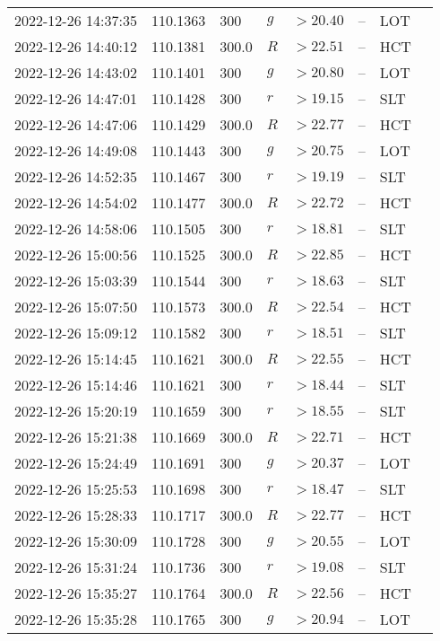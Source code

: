 \documentclass{nature_plusfigure}
\begin{document}
\begin{supplement}
\begin{center}
\begin{longtable}{llllllll}
2022-12-26 14:37:35 & 110.1363 & 300 & $g$ & $>20.40$ & -- & LOT &  \\ 
2022-12-26 14:40:12 & 110.1381 & 300.0 & $R$ & $>22.51$ & -- & HCT &  \\ 
2022-12-26 14:43:02 & 110.1401 & 300 & $g$ & $>20.80$ & -- & LOT &  \\ 
2022-12-26 14:47:01 & 110.1428 & 300 & $r$ & $>19.15$ & -- & SLT &  \\ 
2022-12-26 14:47:06 & 110.1429 & 300.0 & $R$ & $>22.77$ & -- & HCT &  \\ 
2022-12-26 14:49:08 & 110.1443 & 300 & $g$ & $>20.75$ & -- & LOT &  \\ 
2022-12-26 14:52:35 & 110.1467 & 300 & $r$ & $>19.19$ & -- & SLT &  \\ 
2022-12-26 14:54:02 & 110.1477 & 300.0 & $R$ & $>22.72$ & -- & HCT &  \\ 
2022-12-26 14:58:06 & 110.1505 & 300 & $r$ & $>18.81$ & -- & SLT &  \\ 
2022-12-26 15:00:56 & 110.1525 & 300.0 & $R$ & $>22.85$ & -- & HCT &  \\ 
2022-12-26 15:03:39 & 110.1544 & 300 & $r$ & $>18.63$ & -- & SLT &  \\ 
2022-12-26 15:07:50 & 110.1573 & 300.0 & $R$ & $>22.54$ & -- & HCT &  \\ 
2022-12-26 15:09:12 & 110.1582 & 300 & $r$ & $>18.51$ & -- & SLT &  \\ 
2022-12-26 15:14:45 & 110.1621 & 300.0 & $R$ & $>22.55$ & -- & HCT &  \\ 
2022-12-26 15:14:46 & 110.1621 & 300 & $r$ & $>18.44$ & -- & SLT &  \\ 
2022-12-26 15:20:19 & 110.1659 & 300 & $r$ & $>18.55$ & -- & SLT &  \\ 
2022-12-26 15:21:38 & 110.1669 & 300.0 & $R$ & $>22.71$ & -- & HCT &  \\ 
2022-12-26 15:24:49 & 110.1691 & 300 & $g$ & $>20.37$ & -- & LOT &  \\ 
2022-12-26 15:25:53 & 110.1698 & 300 & $r$ & $>18.47$ & -- & SLT &  \\ 
2022-12-26 15:28:33 & 110.1717 & 300.0 & $R$ & $>22.77$ & -- & HCT &  \\ 
2022-12-26 15:30:09 & 110.1728 & 300 & $g$ & $>20.55$ & -- & LOT &  \\ 
2022-12-26 15:31:24 & 110.1736 & 300 & $r$ & $>19.08$ & -- & SLT &  \\ 
2022-12-26 15:35:27 & 110.1764 & 300.0 & $R$ & $>22.56$ & -- & HCT &  \\ 
2022-12-26 15:35:28 & 110.1765 & 300 & $g$ & $>20.94$ & -- & LOT &  \\ 

\end{longtable}
\end{center}
\end{supplement}
\end{document}
